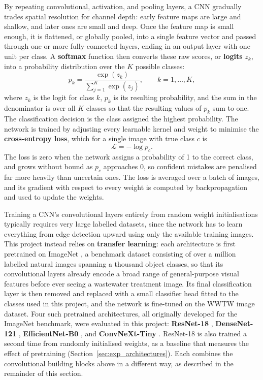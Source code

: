 By repeating convolutional, activation, and pooling layers, a CNN gradually trades spatial resolution for channel depth: early feature maps are large and shallow, and later ones are small and deep. Once the feature map is small enough, it is flattened, or globally pooled, into a single feature vector and passed through one or more fully-connected layers, ending in an output layer with one unit per class. A \textbf{softmax} function then converts these raw scores, or \textbf{logits} $z_k$, into a probability distribution over the $K$ possible classes:
\begin{equation}
p_k = \frac{\exp(z_k)}{\sum_{j=1}^{K}\exp(z_j)}, \qquad k = 1, \dots, K,
\label{eq:softmax}
\end{equation}
where $z_k$ is the logit for class $k$, $p_k$ is its resulting probability, and the sum in the denominator is over all $K$ classes so that the resulting values of $p_k$ sum to one. The classification decision is the class assigned the highest probability. The network is trained by adjusting every learnable kernel and weight to minimise the \textbf{cross-entropy loss}, which for a single image with true class $c$ is
\begin{equation}
\mathcal{L} = -\log p_c.
\label{eq:cross_entropy}
\end{equation}
The loss is zero when the network assigns a probability of 1 to the correct class, and grows without bound as $p_c$ approaches 0, so confident mistakes are penalised far more heavily than uncertain ones. The loss is averaged over a batch of images, and its gradient with respect to every weight is computed by backpropagation and used to update the weights.

Training a CNN's convolutional layers entirely from random weight initialisations typically requires very large labelled datasets, since the network has to learn everything from edge detection upward using only the available training images. This project instead relies on \textbf{transfer learning}: each architecture is first pretrained on ImageNet \citep{deng2009imagenet, russakovsky2015imagenet}, a benchmark dataset consisting of over a million labelled natural images spanning a thousand object classes, so that its convolutional layers already encode a broad range of general-purpose visual features before ever seeing a wastewater treatment image. Its final classification layer is then removed and replaced with a small classifier head fitted to the classes used in this project, and the network is fine-tuned on the WWTW image dataset. Four such pretrained architectures, all originally developed for the ImageNet benchmark, were evaluated in this project: \textbf{ResNet-18} \citep{he2016resnet}, \textbf{DenseNet-121} \citep{huang2017densenet}, \textbf{EfficientNet-B0} \citep{tan2019efficientnet}, and \textbf{ConvNeXt-Tiny} \citep{liu2022convnext}. ResNet-18 is also trained a second time from randomly initialised weights, as a baseline that measures the effect of pretraining (Section~\ref{sec:exp_architectures}). Each combines the convolutional building blocks above in a different way, as described in the remainder of this section.

